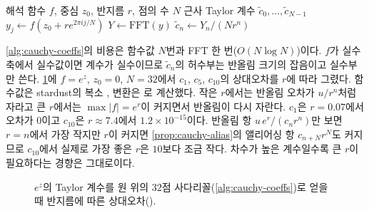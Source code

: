 \begin{algorithm}[htbp]
\begin{algorithmic}[1]
\Require 해석 함수 $f$, 중심 $z_0$, 반지름 $r$, 점의 수 $N$
\Ensure 근사 Taylor 계수 $\tilde c_0,\dots,\tilde c_{N-1}$
 $y_j\gets f(z_0+re^{2\pi ij/N})$ 
\EndFor
\State $Y\gets\mathrm{FFT}(y)$ 
 $\tilde c_n\gets Y_n/(Nr^n)$
\EndFor
\end{algorithmic}
\caption{원 위의 사다리꼴로 Taylor 계수 얻기}
\label{alg:cauchy-coeffs}
\end{algorithm}

\cref{alg:cauchy-coeffs}의 비용은 함수값 $N$번과 FFT 한 번($O(N\log N)$)이다. $f$가 실수축에서 실수값이면 계수가 실수이므로 $\tilde c_n$의 허수부는 반올림 크기의 잡음이고 실수부만 쓴다. \cref{fig:cauchy-radius}에 $f=e^z$, $z_0=0$, $N=32$에서 $c_1$, $c_5$, $c_{10}$의 상대오차를 $r$에 따라 그렸다. 함수값은 stardust의 복소 , 변환은 로 계산했다. 작은 $r$에서는 반올림 오차가 $u/r^n$처럼 자라고 큰 $r$에서는 $\max|f|=e^r$이 커지면서 반올림이 다시 자란다. $c_1$은 $r=0.07$에서 오차가 $0$이고 $c_{10}$은 $r\approx7.4$에서 $1.2\times10^{-15}$이다. 반올림 항 $u\,e^r/(c_nr^n)$만 보면 $r=n$에서 가장 작지만 $r$이 커지면 \cref{prop:cauchy-alias}의 앨리어싱 항 $c_{n+N}r^N$도 커지므로 $c_{10}$에서 실제로 가장 좋은 $r$은 $10$보다 조금 작다. 차수가 높은 계수일수록 큰 $r$이 필요하다는 경향은 그대로이다.

\begin{figure}[htbp]
\centering
{}
\caption{$e^z$의 Taylor 계수를 원 위의 $32$점 사다리꼴(\cref{alg:cauchy-coeffs})로 얻을 때 반지름에 따른 상대오차().}
\label{fig:cauchy-radius}
\end{figure}

